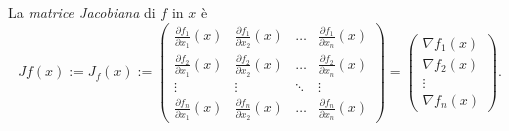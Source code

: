 \documentclass[11pt]{scrartcl}
\begin{document}
	\begin{definition}
		La \textit{matrice Jacobiana} di $f$ in $x$ è 
		$$Jf(x):=J_f(x):=\begin{pmatrix}
			\frac{\partial f_1}{\partial x_1}(x) & \frac{\partial f_1}{\partial x_2}(x) & \dots & \frac{\partial f_1}{\partial x_n}(x) \\
			\frac{\partial f_2}{\partial x_1}(x) & \frac{\partial f_2}{\partial x_2}(x) & \dots & \frac{\partial f_2}{\partial x_n}(x) \\
			\vdots & \vdots & \ddots & \vdots \\
			\frac{\partial f_n}{\partial x_1}(x) & \frac{\partial f_n}{\partial x_2}(x) & \dots & \frac{\partial f_n}{\partial x_n}(x)
		\end{pmatrix}=\begin{pmatrix}
		\nabla f_1(x) \\
		\nabla f_2(x) \\
		\vdots \\
		\nabla f_n(x)
		\end{pmatrix}.$$
	\end{definition}
	 
\end{document}
